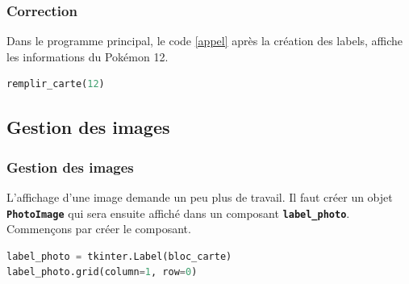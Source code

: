 \documentclass[svgnames,11pt]{beamer}
\begin{document}
\begin{frame}[fragile]
    \frametitle{Correction}

    Dans le programme principal, le code \ref{appel} après la création des labels, affiche les informations du Pokémon 12.

    \begin{center}
        \begin{lstlisting}[language=Python , basicstyle=\ttfamily\small, xleftmargin=1em, xrightmargin=1em]
remplir_carte(12)
\end{lstlisting}
        \label{appel}
    \end{center}

\end{frame}

\subsection{Gestion des images}
\begin{frame}[fragile]
    \frametitle{Gestion des images}

    L'affichage d'une image demande un peu plus de travail. Il faut créer un objet \textbf{\texttt{PhotoImage}} qui sera ensuite affiché dans un composant \textbf{\texttt{label\_photo}}. Commençons par créer le composant.
    \begin{center}
        \begin{lstlisting}[language=Python , basicstyle=\ttfamily\small, xleftmargin=1em, xrightmargin=1em]
label_photo = tkinter.Label(bloc_carte)
label_photo.grid(column=1, row=0)  
\end{lstlisting}
        \label{CODE}
    \end{center}

\end{frame}
\end{document}
